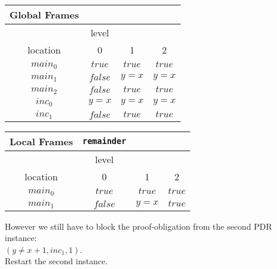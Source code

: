 \documentclass{article}
\begin{document}
	\begin{minipage}{.4\textwidth}
		\setlength\tabcolsep{0.35em}
		\begin{center}
			\begin{tabu}{cccc}
				Global Frames \\
				\toprule
				& level \\
				\cmidrule(lr){2-4}
				location & 0 & 1 & 2 \\
				$main_0$ & $true$ & $true$ & $true$  \\
				$main_1$ & $false$ & $y = x$ & $y = x$\\
				$main_2$ & $false$ & $true$ & $true$ \\
				$inc_0$ & $y = x$ & $y = x$ & $y = x$ \\
				$inc_1$ & $false$ & $true$ & $true$\\
				\bottomrule
			\end{tabu}
		\end{center}
	\end{minipage}
	\hfill
	\begin{minipage}{.5\textwidth}
		\setlength\tabcolsep{0.35em}
		\begin{center}
			\begin{tabu}{cccc}
				Local Frames & \texttt{remainder}\\
				\toprule
				& level \\
				\cmidrule(lr){2-4}
				location & 0 & 1 & 2 \\
				\cmidrule{1-4}
				$main_0$ & $true$ & $true$ & $true$ \\
				$main_1$ & $false$ & $y = x$ & $true$\\
				\bottomrule
			\end{tabu}
		\end{center}	
	\end{minipage}

	\vspace*{2em}
	
	However we still have to block the proof-obligation from the second PDR instance: \\ $(y \neq x + 1, inc_1, 1)$. \\ Restart the second instance. \\ \\
	
\end{document}
